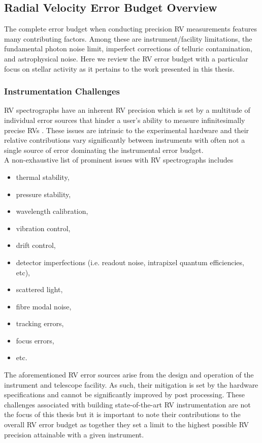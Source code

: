 \subsection{Radial Velocity Error Budget Overview} \label{sect:error}
The complete error budget when conducting precision RV measurements features many contributing factors.
Among these are instrument/facility limitations, the fundamental photon noise limit, imperfect corrections
of telluric contamination, and astrophysical noise. Here we review the RV error budget
with a particular focus on stellar activity as it pertains to the work presented in this thesis.

\subsubsection{Instrumentation Challenges}
RV spectrographs have an inherent RV precision which is set by a multitude of individual error sources
that hinder a user's ability to measure infinitesimally precise
RVs \citep{podgorski14,halverson16}.
These issues are intrinsic to the experimental hardware and their relative contributions
vary significantly between instruments with often not a single source of error dominating the instrumental
error budget. \\

A non-exhaustive list of prominent issues with RV spectrographs includes 

\begin{multicols}{2}
  \begin{itemize}
  \item thermal stability,
  \item pressure stability,
  \item wavelength calibration,
  \item vibration control,
  \item drift control,
  \item detector imperfections (i.e. readout noise, intrapixel quantum efficiencies, etc),
  \item scattered light,
  \item fibre modal noise,
  \item tracking errors,
  \item focus errors,
  \item etc.
  \end{itemize}
\end{multicols}
  
\noindent The aforementioned RV error sources arise from the design and operation of the
instrument and telescope facility. As such, their mitigation is set by the hardware specifications
and cannot be significantly improved by post processing. These challenges associated with building
state-of-the-art RV instrumentation are not the focus of
this thesis but it is important to note their contributions to the overall RV error budget as together
they set a limit to the highest possible RV precision attainable with a given instrument.

